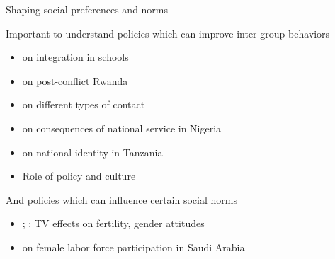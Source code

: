 \documentclass[aspectratio=169, 10pt, handout]{beamer}
\newenvironment{wideitemize}{\itemize\addtolength{\itemsep}{10pt}}{\enditemize}
\begin{document}
\begin{frame}{Shaping social preferences and norms}

\begin{wideitemize}

	\item Important to understand policies which can improve inter-group behaviors

	\begin{itemize}

		\item \cite{rao2018familiarity} on integration in schools

		\item \cite{blouin2017erasing}
		on post-conflict Rwanda

        \item \cite{lowe2018unity} on different types of contact

        \item \cite{okunogbe2018does} on consequences of national service in Nigeria
	
		\item \cite{miguel2004tribe} on national identity in Tanzania
	
		\item Role of policy and culture \citep{miguel2005ethnic}

	\end{itemize}

	\item And policies which can influence certain social norms

	\begin{itemize}
	
		\item \cite{la2012soap}; \cite{jensen2009power}: TV effects on fertility, gender attitudes

		\item \cite{bursztyn2018misperceived} on female labor force participation in Saudi Arabia

	\end{itemize}
	
\end{wideitemize}

\end{frame}
\end{document}
